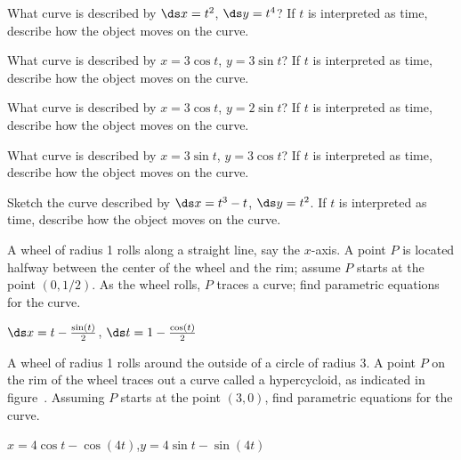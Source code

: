 \begin{exercises}

\exercise What curve is described by $\ds x=t^2$, $\ds y=t^4$? If $t$ is
interpreted as time, describe how the object moves on the curve.

\exercise What curve is described by $x=3\cos t$, $y=3\sin t$? If $t$ is
interpreted as time, describe how the object moves on the curve.

\exercise What curve is described by $x=3\cos t$, $y=2\sin t$? If $t$ is
interpreted as time, describe how the object moves on the curve.

\exercise What curve is described by $x=3\sin t$, $y=3\cos t$? If $t$ is
interpreted as time, describe how the object moves on the curve.

\exercise Sketch the curve described by $\ds x=t^3-t$, $\ds y=t^2$. If $t$ is
interpreted as time, describe how the object moves on the curve.

\exercise A wheel of radius 1 rolls along a straight line, say the
$x$-axis. A point $P$ is located halfway between the center of the
wheel and the rim; assume $P$ starts at the point $(0,1/2)$. As the
wheel rolls, $P$ traces a curve; find parametric equations for the
curve.
\label{exer:pseudo cycloid}
\begin{answer} $\ds x=t-{\sin(t)\over2}$, $\ds t=1-{\cos(t)\over2}$
\end{answer}

\exercise A wheel of radius 1 rolls around the outside of a circle of
radius 3. A point $P$ on the rim of the wheel traces out a curve
called a {\dfont hypercycloid}, as indicated in
figure~.  Assuming $P$
starts at the point $(3,0)$, find parametric equations for the curve.
\begin{answer} $x=4\cos t-\cos(4t)$,\hfill\break  $y=4\sin t-\sin(4t)$
\end{answer}
\label{exer:hypercycloid}


\end{exercises}
